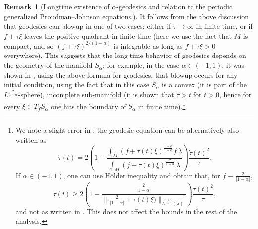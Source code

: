 \documentclass[11pt,reqno]{amsart}
\theoremstyle{definition}
\newtheorem{remark}[theorem]{Remark}
\begin{document}
\begin{remark}[Longtime existence of $\alpha$-geodesics and relation to the periodic generalized Proudman--Johnson equations.]
It follows from the above discussion that geodesics can blowup in one of two cases: either if $\tau\to \infty$ in finite time, or if $f+\tau \xi$ leaves the positive quadrant in finite time (here we use the fact that $M$ is compact, and so $(f+\tau \xi)^{2/(1-\alpha)}$ is integrable as long as $f+\tau \xi >0$ everywhere).
This suggests that the long time behavior of geodesics depends on the geometry of the manifold $S_\alpha$; for example, in the case $\alpha\in (-1,1)$, it was shown in \cite[Theorem 4.11]{bauer2024p}, using the above formula for geodesics, that blowup occurs for any initial condition, using the fact that in this case $S_\alpha$ is a convex (it is part of the $L^{\frac{2}{1-\alpha}}$-sphere), incomplete sub-manifold (it is shown that $\tau>t$ for $t>0$, hence for every $\xi\in T_fS_\alpha$ one hits the boundary of $S_\alpha$ in finite time).\footnote{We note a slight error in \cite{bauer2024p}:
the geodesic equation can be alternatively also written as
\[
    \ddot\tau (t) = 2 \left(1-\frac{\int_M (f + \tau(t)\xi)^{\frac{1+\alpha}{1-\alpha}} f \,\lambda}{\int_M (f + \tau(t)\xi)^{\frac{2}{1-\alpha}} \,\lambda}\right)\frac{\dot\tau(t)^2}{\tau}.
\]
If $\alpha\in (-1,1)$, one can use H\"older inequality and obtain that, for $f\equiv \frac{2}{|1-\alpha|}$,
\[
\ddot\tau (t) \ge 2 \left(1-\frac{\frac{2}{|1-\alpha|}}{\|\frac{2}{|1-\alpha|} + \tau(t)\xi)\|_{L^{\frac{2}{1-\alpha}}(\lambda)}}\right)\frac{\dot\tau(t)^2}{\tau},
\]
and not as written in \cite[Eq.~(25)]{bauer2024p}.
This does not affect the bounds in the rest of the analysis.}

\end{remark}
\end{document}
